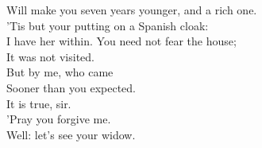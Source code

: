 \documentclass[a4paper,oneside]{memoir}
\begin{document}
\begin{drama*}
Will make you seven years younger, and a rich one.\\
'Tis but your putting on a Spanish cloak:\\
I have her within. You need not fear the house;\\
It was not visited.\\
\lovewitspeaks {} But by me, who came\\
Sooner than you expected.\\
\facespeaks {} It is true, sir.\\
'Pray you forgive me.\\
\lovewitspeaks {} Well: let's see your widow.\\
\scene


\end{drama*}
\end{document}
